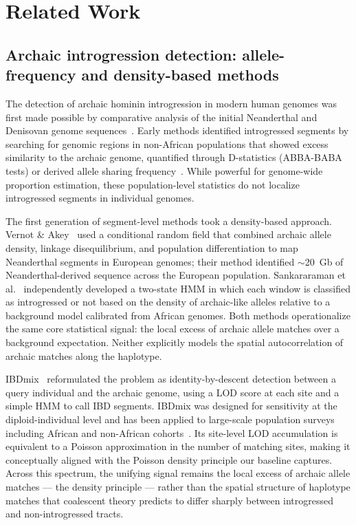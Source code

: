 \section*{Related Work}

\subsection*{Archaic introgression detection: allele-frequency and density-based methods}

The detection of archaic hominin introgression in modern human genomes was first
made possible by comparative analysis of the initial Neanderthal and Denisovan
genome sequences~\citep{green2010draft, reich2010genetic}.
Early methods identified introgressed segments by searching for genomic regions
in non-African populations that showed excess similarity to the archaic genome,
quantified through D-statistics (ABBA-BABA tests) or derived allele sharing
frequency~\citep{patterson2012ancient, durand2011testing, green2010draft}.
While powerful for genome-wide proportion estimation, these population-level statistics
do not localize introgressed segments in individual genomes.

The first generation of segment-level methods took a density-based approach.
Vernot \& Akey~\citeyear{vernot2014resurrecting} used a conditional random field
that combined archaic allele density, linkage disequilibrium, and population
differentiation to map Neanderthal segments in European genomes; their method
identified $\sim$20~Gb of Neanderthal-derived sequence across the European
population.
Sankararaman et al.~\citeyear{sankararaman2014genomic} independently developed
a two-state HMM in which each window is classified as introgressed or not
based on the density of archaic-like alleles relative to a background model
calibrated from African genomes.
Both methods operationalize the same core statistical signal: the local excess of
archaic allele matches over a background expectation.
Neither explicitly models the spatial autocorrelation of archaic matches along
the haplotype.

IBDmix~\citep{chen2020identifying} reformulated the problem as identity-by-descent
detection between a query individual and the archaic genome, using a LOD score
at each site and a simple HMM to call IBD segments.
IBDmix was designed for sensitivity at the diploid-individual level and has
been applied to large-scale population surveys including African and non-African
cohorts~\citep{chen2020identifying}.
Its site-level LOD accumulation is equivalent to a Poisson approximation in the
number of matching sites, making it conceptually aligned with the Poisson density
principle our baseline captures.
Across this spectrum, the unifying signal remains the local excess of archaic
allele matches --- the density principle --- rather than the spatial structure
of haplotype matches that coalescent theory predicts to differ sharply between
introgressed and non-introgressed tracts.

